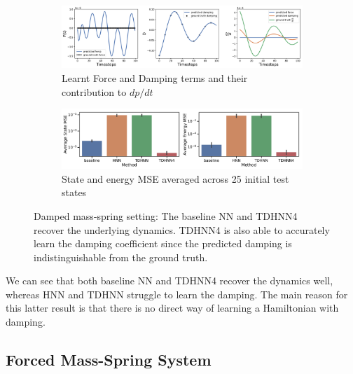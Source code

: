 \documentclass[twoside]{article}
\begin{document}
\begin{figure}[h!]
\centering
\captionsetup{justification=centering}
	\begin{subfigure}[b]{0.48\textwidth}
		\centering
		\includegraphics[width=\textwidth]{figures/figures/damped/1/damped_dpdt_0.pdf}
		\caption{Learnt Force and Damping terms and their contribution to $dp/dt$}
	\end{subfigure}
	\begin{subfigure}[b]{0.48\textwidth}
	    \centering
		\includegraphics[width=\textwidth]{figures/figures/damped/1/damped_errors_0.pdf}
		\caption{State and energy MSE averaged across 25 initial test states}
	\end{subfigure}
\caption{Damped mass-spring setting: The baseline NN and TDHNN4 recover the underlying dynamics. TDHNN4 is also able to accurately learn the damping coefficient since the predicted damping is indistinguishable from the ground truth.}
\label{damped}
\end{figure}

We can see that both baseline NN and TDHNN4 recover the dynamics well, whereas HNN and TDHNN struggle to learn the damping. The main reason for this latter result is that there is no direct way of learning a Hamiltonian with damping.

\subsection{Forced Mass-Spring System}
\end{document}
